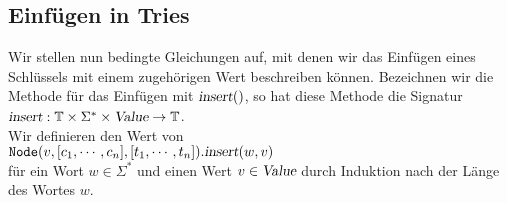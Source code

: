 \subsection{Einf\"ugen in Tries}
Wir stellen nun bedingte Gleichungen auf, mit denen wir das Einf\"ugen eines Schl\"ussels mit
einem zugeh\"origen Wert beschreiben k\"onnen.  Bezeichnen wir die Methode f\"ur das Einf\"ugen
mit $\textsl{insert}()$, so hat diese Methode die Signatur
\\[0.2cm]
\hspace*{1.3cm}
$\textsl{insert}: \mathbb{T} \times \Sigma^* \times \textsl{Value} \rightarrow \mathbb{T}$.
\\[0.2cm]
Wir definieren den Wert von \\[0.2cm]
\hspace*{1.3cm} 
$\texttt{Node}(v, [c_1, \cdots, c_n], [t_1, \cdots, t_n]).\textsl{insert}(w,v)$
\\[0.2cm]
f\"ur ein Wort $w\in \Sigma^*$ und einen Wert $v \in \textsl{Value}$ durch Induktion nach der L\"ange des Wortes $w$.
